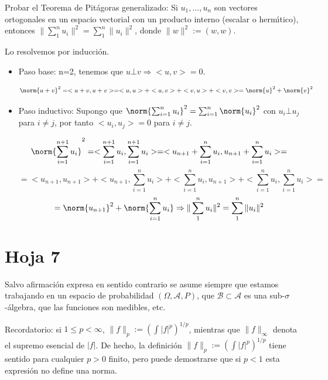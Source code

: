 
\begin{problem}[3] Probar el Teorema de Pit\'agoras generalizado: Si $u_1, \dots, u_n$ son vectores ortogonales
en un espacio vectorial con un producto interno (escalar o herm\'{\i}tico), entonces
$\|\sum_1^n u_i\|^2 = \sum_1^n \| u_i\|^2$, donde  $\| w\|^2:= (w,w)$.

\solution

\begin{expla}
Lo resolvemos por inducción.
\end{expla}

\begin{itemize}
\item Paso base: n=2, tenemos que $u \bot v \Rightarrow <u,v>=0$.

\[
\norm{u+v}^2=<u+v,u+v>=<u,u>+<u,v>+<v,u>+<v,v> = \norm{u}^2 + \norm{v}^2
\]

\item Paso inductivo: Supongo que $\norm{\sum_{i=1}^n u_i}^2 = \sum_{i=1}^{n} \norm{u_i}^2 $ con $u_i \bot u_j$ para $i\neq j$, por tanto $<u_i,u_j>=0$ para $i \neq j$.

\[
\norm{\sum_{i=1}^{n+1} u_i}^2 = <\sum_{i=1}^{n+1} u_i, \sum_{i=1}^{n+1} u_i> = <u_{n+1}+\sum_{i=1}^n u_i,u_{n+1}+\sum_{i=1}^n u_i> =
\]
\[
= <u_{n+1},u_{n+1}>+<u_{n+1},\sum_{i=1}^n u_i> + <\sum_{i=1}^n u_i, u_{n+1}>+<\sum_{i=1}^n u_i,\sum_{i=1}^n u_i>=
\]
\[
=\norm{u_{n+1}}^2 + \norm{\sum_{i=1}^{n} u_i} \Rightarrow \|\sum_1^n u_i\|^2 = \sum_1^n \| u_i\|^2
\]
\end{itemize}



\end{problem}



\newpage
\section{Hoja 7}

Salvo afirmaci\'on expresa en sentido
contrario se asume siempre que estamos trabajando en un espacio de probabilidad $(\Omega, \mathcal{A}, P)$,
que  $\mathcal{B}\subset \mathcal{A}$ es una sub-$\sigma$-\'algebra, que las funciones son medibles, etc.

Recordatorio: si $1\le p < \infty$, $\|f\|_p := \left(\int|f|^p\right)^{1/p}$, mientras que
$\|f\|_\infty$ denota el supremo esencial de $|f|$. De hecho, la definici\'on
 $\|f\|_p := \left(\int|f|^p\right)^{1/p}$ tiene sentido para cualquier $p > 0$ finito, pero puede
demostrarse que si $p < 1$ esta expresi\'on no define una norma.


